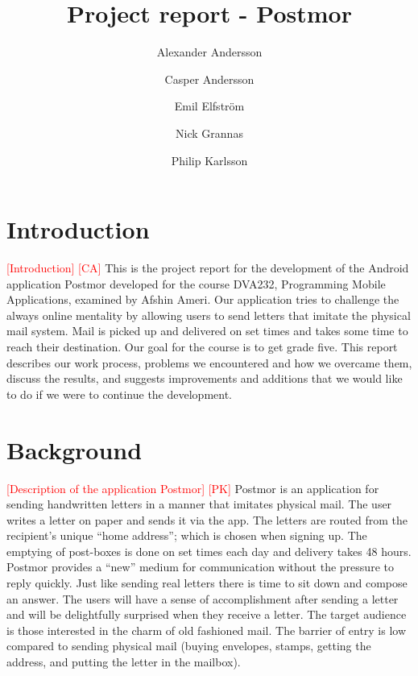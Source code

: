 \documentclass[acmlarge, review=false, screen=true]{acmart}
\begin{document}
\title{Project report - Postmor}

\author{Alexander Andersson}
\author{Casper Andersson}
\author{Emil Elfström}
\author{Nick Grannas}
\author{Philip Karlsson}




\maketitle
  \section{Introduction}
    \textcolor{red}{[Introduction] [CA]} \newline
    This is the project report for the development of the Android application Postmor developed for the course DVA232, Programming Mobile Applications, examined by Afshin Ameri. Our application tries to challenge the always online mentality by allowing users to send letters that imitate the physical mail system. Mail is picked up and delivered on set times and takes some time to reach their destination. Our goal for the course is to get grade five. This report describes our work process, problems we encountered and how we overcame them, discuss the results, and suggests improvements and additions that we would like to do if we were to continue the development.

  \section{Background}
    \textcolor{red}{[Description of the application Postmor] [PK]} \newline
    Postmor is an application for sending handwritten letters in a manner that imitates physical mail. The user writes a letter on paper and sends it via the app. The letters are routed from the recipient’s unique “home address”; which is chosen when signing up. The emptying of post-boxes is done on set times each day and delivery takes 48 hours. Postmor provides a “new” medium for communication without the pressure to reply quickly. Just like sending real letters there is time to sit down and compose an answer. The users will have a sense of accomplishment after sending a letter and will be delightfully surprised when they receive a letter. The target audience is those interested in the charm of old fashioned mail. The barrier of entry is low compared to sending physical mail (buying envelopes, stamps, getting the address, and putting the letter in the mailbox).
\end{document}
